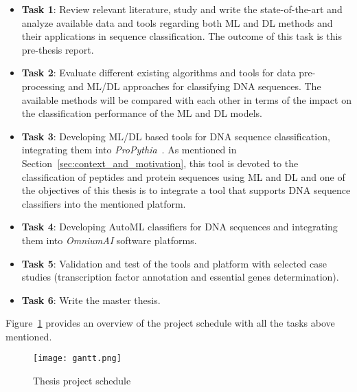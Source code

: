 \begin{itemize}
    \item \textbf{Task 1}: Review relevant literature, study and write the state-of-the-art and analyze available data and tools regarding both \gls{ML} and \gls{DL} methods and their applications in sequence classification. The outcome of this task is this pre-thesis report.
    \item \textbf{Task 2}: Evaluate different existing algorithms and tools for data pre-processing and \gls{ML}/\gls{DL} approaches for classifying DNA sequences. The available methods will be compared with each other in terms of the impact on the classification performance of the \gls{ML} and \gls{DL} models.
    \item \textbf{Task 3}: Developing \gls{ML}/\gls{DL} based tools for DNA sequence classification, integrating them into \textit{ProPythia}~\cite{Sequeira2020ProPythia:Learning}. As mentioned in Section~\ref{sec:context_and_motivation}, this tool is devoted to the classification of peptides and protein sequences using \gls{ML} and \gls{DL} and one of the objectives of this thesis is to integrate a tool that supports \gls{DNA} sequence classifiers into the mentioned platform.
    \item \textbf{Task 4}: Developing \gls{AutoML} classifiers for \gls{DNA} sequences and integrating them into \textit{OmniumAI} software platforms.
    \item \textbf{Task 5}: Validation and test of the tools and platform with selected case studies (transcription factor annotation and essential genes determination). 
    \item \textbf{Task 6}: Write the master thesis.
\end{itemize}

Figure~\ref{fig:gantt} provides an overview of the project schedule with all the tasks above mentioned.

\begin{figure}[htbp]
    \centering
    \texttt{[image: gantt.png]}
    \caption{Thesis project schedule}
    \label{fig:gantt}
\end{figure}